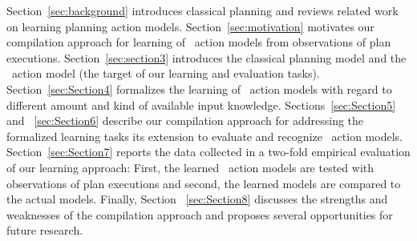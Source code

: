 Section~\ref{sec:background} introduces classical planning and reviews related work on learning planning action models. Section~\ref{sec:motivation} motivates our compilation approach for learning of \strips\ action models from observations of plan executions. Section~\ref{sec:section3} introduces the classical planning model and the \strips\ action model (the target of our learning and evaluation tasks). Section~\ref{sec:Section4} formalizes the learning of \strips\ action models with regard to different amount and kind of available input knowledge. Sections~\ref{sec:Section5} and ~\ref{sec:Section6} describe our compilation approach for addressing the formalized learning tasks its extension to evaluate and recognize \strips\ action models. Section~\ref{sec:Section7} reports the data collected in a two-fold empirical evaluation of our learning approach: First, the learned \strips\ action models are tested with observations of plan executions and second, the learned models are compared to the actual models. Finally, Section ~\ref{sec:Section8} discusses the strengths and weaknesses of the compilation approach and proposes several opportunities for future research.

 
